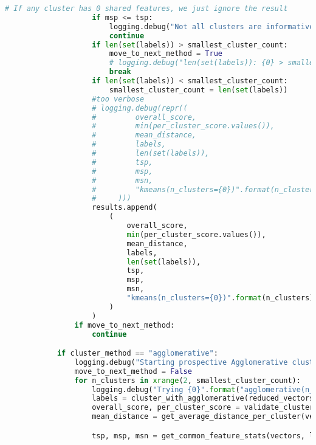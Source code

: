 \begin{lstlisting}[language=python]
                    # If any cluster has 0 shared features, we just ignore the result
                    if msp <= tsp:
                        logging.debug("Not all clusters are informative (a cluster has 0 shared features) ")
                        continue
                    if len(set(labels)) > smallest_cluster_count:
                        move_to_next_method = True
                        # logging.debug("len(set(labels)): {0} > smallest_cluster_count: {1}".format(len(set(labels)), smallest_cluster_count))
                        break
                    if len(set(labels)) < smallest_cluster_count:
                        smallest_cluster_count = len(set(labels))
                    #too verbose
                    # logging.debug(repr((
                    #         overall_score,
                    #         min(per_cluster_score.values()),
                    #         mean_distance,
                    #         labels,
                    #         len(set(labels)),
                    #         tsp,
                    #         msp,
                    #         msn,
                    #         "kmeans(n_clusters={0})".format(n_clusters)
                    #     )))
                    results.append(
                        (
                            overall_score,
                            min(per_cluster_score.values()),
                            mean_distance,
                            labels,
                            len(set(labels)),
                            tsp,
                            msp,
                            msn,
                            "kmeans(n_clusters={0})".format(n_clusters)
                        )
                    )
                if move_to_next_method:
                    continue

            if cluster_method == "agglomerative":
                logging.debug("Starting prospective Agglomerative clusterings")
                move_to_next_method = False
                for n_clusters in xrange(2, smallest_cluster_count):
                    logging.debug("Trying {0}".format("agglomerative(n_clusters={0})".format(n_clusters)))
                    labels = cluster_with_agglomerative(reduced_vectors, n_clusters=n_clusters, metric=metric)
                    overall_score, per_cluster_score = validate_clusters(vectors, labels)
                    mean_distance = get_average_distance_per_cluster(vectors, labels)[0]

                    tsp, msp, msn = get_common_feature_stats(vectors, labels, vectorizer)


\end{lstlisting}
